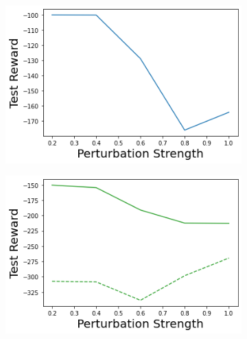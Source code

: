 \begin{figure}
\begin{subfigure}{.245\textwidth}
    \end{subfigure}
    \begin{subfigure}{.245\textwidth}
        \includegraphics[width=\textwidth]{sections/011_icml2022/resources/transition_shift-DKL-AcrobotShift-v0-mean_reward_.png}
    \end{subfigure}
    \begin{subfigure}{.245\textwidth}
        \includegraphics[width=\textwidth]{sections/011_icml2022/resources/transition_shift-PostNet-AcrobotShift-v0-mean_reward_.png}
    \end{subfigure}
    

\end{figure}
